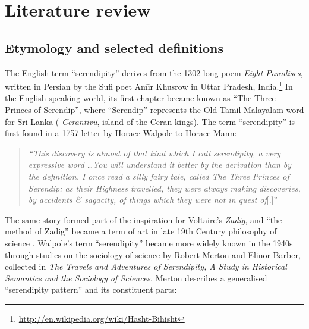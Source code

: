 
\section{Literature review} \label{sec:literature-review}

\subsection{Etymology and selected definitions} \label{sec:overview-serendipity}  
The English term ``serendipity'' derives from the 1302 long poem \emph{Eight Paradises}, written in Persian by the Sufi poet Am\={\i}r Khusrow in Uttar Pradesh, India.\footnote{\url{http://en.wikipedia.org/wiki/Hasht-Bihisht}}  In the English-speaking world, its first chapter became known as ``The Three Princes of Serendip'', where ``Serendip'' represents the Old Tamil-Malayalam word for Sri Lanka (%
\emph{Cerantivu}, island of the Ceran kings).
%
The term ``serendipity'' is first found in a 1757 letter by Horace Walpole to Horace Mann:
\begin{quote}
\emph{``This discovery is almost of that kind which I call serendipity, a very expressive
word} \ldots \emph{You will understand it better by the derivation than by the
definition. I once read a silly fairy tale, called The Three Princes of Serendip:
as their Highness travelled, they were always making discoveries, by accidents
\& sagacity, of things which they were not in quest of}[.]''~\cite[p. 633]{van1994anatomy}
\end{quote}
The same story formed part of the inspiration for Voltaire's \emph{Zadig}, and ``the method of Zadig'' became a term of art in late 19th Century philosophy of science \cite{huxley1894science}.
Walpole's term ``serendipity'' became more widely known in the 1940s through studies on the sociology of science by Robert Merton and Elinor Barber, collected in \emph{The Travels and Adventures of Serendipity, A Study in Historical Semantics and the Sociology of Sciences}.  Merton \citeyear{merton1948bearing} \cite<summarised in>[pp. 195--196]{merton} describes a generalised ``serendipity pattern'' and its constituent parts:


